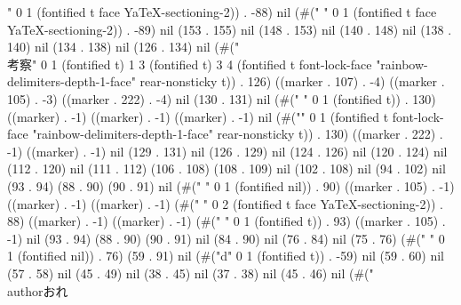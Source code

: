 " 0 1 (fontified t face YaTeX-sectioning-2)) . -88) nil (#(" " 0 1 (fontified t face YaTeX-sectioning-2)) . -89) nil (153 . 155) nil (148 . 153) nil (140 . 148) nil (138 . 140) nil (134 . 138) nil (126 . 134) nil (#("\\考察{" 0 1 (fontified t) 1 3 (fontified t) 3 4 (fontified t font-lock-face "rainbow-delimiters-depth-1-face" rear-nonsticky t)) . 126) ((marker . 107) . -4) ((marker . 105) . -3) ((marker . 222) . -4) nil (130 . 131) nil (#("
" 0 1 (fontified t)) . 130) ((marker) . -1) ((marker) . -1) ((marker) . -1) nil (#("}" 0 1 (fontified t font-lock-face "rainbow-delimiters-depth-1-face" rear-nonsticky t)) . 130) ((marker . 222) . -1) ((marker) . -1) nil (129 . 131) nil (126 . 129) nil (124 . 126) nil (120 . 124) nil (112 . 120) nil (111 . 112) (106 . 108) (108 . 109) nil (102 . 108) nil (94 . 102) nil (93 . 94) (88 . 90) (90 . 91) nil (#("
" 0 1 (fontified nil)) . 90) ((marker . 105) . -1) ((marker) . -1) ((marker) . -1) (#("
 " 0 2 (fontified t face YaTeX-sectioning-2)) . 88) ((marker) . -1) ((marker) . -1) (#(" " 0 1 (fontified t)) . 93) ((marker . 105) . -1) nil (93 . 94) (88 . 90) (90 . 91) nil (84 . 90) nil (76 . 84) nil (75 . 76) (#(" " 0 1 (fontified nil)) . 76) (59 . 91) nil (#("d" 0 1 (fontified t)) . -59) nil (59 . 60) nil (57 . 58) nil (45 . 49) nil (38 . 45) nil (37 . 38) nil (45 . 46) nil (#("\\author{おれ}
